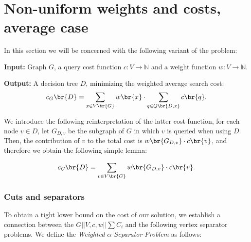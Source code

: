 \newpage
\section{Non-uniform weights and costs, average case}
In this section we will be concerned with the following variant of the problem:
\begin{tcolorbox}[colback=white, title=$G||V,c,w||\sum C_j$, fonttitle=\bfseries, breakable]
\textbf{Input:} Graph $G$, a query cost function $c:V\to \mathbb{N}$ and a weight function $w:V\to \mathbb{N}$.

\textbf{Output:} A decision tree $D$, minimizing the weighted average search cost: 
$$
c_G\br{D} = \sum_{x\in V\br{G}}w\br{x}\cdot \sum_{q\in Q\br{D, x}}c\br{q}.
$$
\end{tcolorbox}
We introduce the following reinterpretation of the latter cost function, 
for each node $v \in D$, let $G_{D,v}$ be the subgraph of $G$ in which 
$v$ is queried when using $D$. 
Then, the contribution of $v$ to the total cost is $w\br{G_{D,v}} \cdot c\br{v}$, 
and therefore we obtain the following simple lemma:

\begin{lemma}\label{contributionLemma}
$$
c_G\br{D} = \sum_{v \in V\br{G}} w\br{G_{D,v}} \cdot c\br{v}.
$$  
\end{lemma}
\subsubsection{Cuts and separators}\label{cutsAndSeparators}
To obtain a tight lower bound on the cost of our solution, 
we establish a connection between the $G||V,c,w||\sum C_i$ and the following 
vertex separator problems. 
We define the \textit{Weighted $\alpha$-Separator Problem} as follows:


